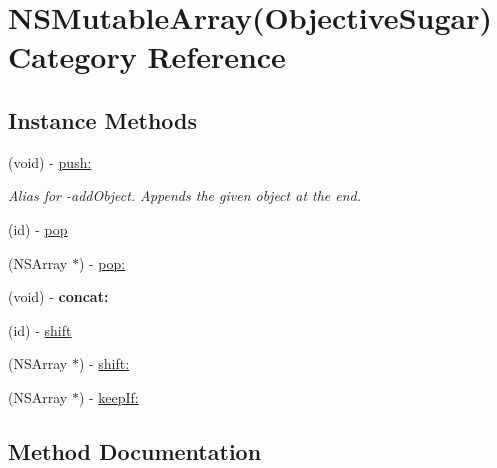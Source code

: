 \hypertarget{category_n_s_mutable_array_07_objective_sugar_08}{}\section{N\+S\+Mutable\+Array(Objective\+Sugar) Category Reference}
\label{category_n_s_mutable_array_07_objective_sugar_08}
\subsection*{Instance Methods}
\begin{DoxyCompactItemize}
\item 
\hypertarget{category_n_s_mutable_array_07_objective_sugar_08_a7ad429e686fb5cb9bd0e04680059ff5d}{}(void) -\/ \hyperlink{category_n_s_mutable_array_07_objective_sugar_08_a7ad429e686fb5cb9bd0e04680059ff5d}{push\+:}\label{category_n_s_mutable_array_07_objective_sugar_08_a7ad429e686fb5cb9bd0e04680059ff5d}

\begin{DoxyCompactList}\small\item\em Alias for -\/add\+Object. Appends the given object at the end. \end{DoxyCompactList}\item 
(id) -\/ \hyperlink{category_n_s_mutable_array_07_objective_sugar_08_ac4129208df596457e004645292f1434d}{pop}
\item 
(N\+S\+Array $\ast$) -\/ \hyperlink{category_n_s_mutable_array_07_objective_sugar_08_a256b5bdfd8dca2eb15f8363a871ad4b3}{pop\+:}
\item 
\hypertarget{category_n_s_mutable_array_07_objective_sugar_08_a4c08389f34039d2ca8f504c3991128e1}{}(void) -\/ {\bfseries concat\+:}\label{category_n_s_mutable_array_07_objective_sugar_08_a4c08389f34039d2ca8f504c3991128e1}

\item 
(id) -\/ \hyperlink{category_n_s_mutable_array_07_objective_sugar_08_af5f290289fa0fc28a9f55f0ceaf60b49}{shift}
\item 
(N\+S\+Array $\ast$) -\/ \hyperlink{category_n_s_mutable_array_07_objective_sugar_08_aa6f2930f4f68082112b676ddcce74942}{shift\+:}
\item 
(N\+S\+Array $\ast$) -\/ \hyperlink{category_n_s_mutable_array_07_objective_sugar_08_a6272b17139bdcf9dbfc8974cf05eae46}{keep\+If\+:}
\end{DoxyCompactItemize}


\subsection{Method Documentation}
\hypertarget{category_n_s_mutable_array_07_objective_sugar_08_a6272b17139bdcf9dbfc8974cf05eae46}{}
